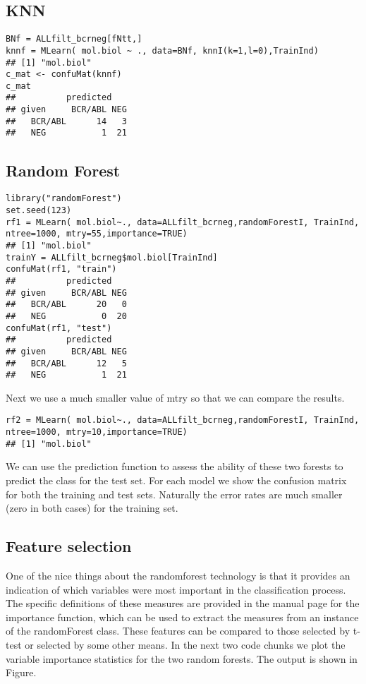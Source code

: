\hypertarget{knn}{%
\subsection{KNN}\label{knn}}

\begin{verbatim}
BNf = ALLfilt_bcrneg[fNtt,]
knnf = MLearn( mol.biol ~ ., data=BNf, knnI(k=1,l=0),TrainInd)
## [1] "mol.biol"
c_mat <- confuMat(knnf)
c_mat 
##          predicted
## given     BCR/ABL NEG
##   BCR/ABL      14   3
##   NEG           1  21
\end{verbatim}

\hypertarget{random-forest}{%
\subsection{Random Forest}\label{random-forest}}

\begin{verbatim}
library("randomForest")
set.seed(123)
rf1 = MLearn( mol.biol~., data=ALLfilt_bcrneg,randomForestI, TrainInd, ntree=1000, mtry=55,importance=TRUE)
## [1] "mol.biol"
trainY = ALLfilt_bcrneg$mol.biol[TrainInd]
confuMat(rf1, "train")
##          predicted
## given     BCR/ABL NEG
##   BCR/ABL      20   0
##   NEG           0  20
confuMat(rf1, "test")
##          predicted
## given     BCR/ABL NEG
##   BCR/ABL      12   5
##   NEG           1  21
\end{verbatim}

Next we use a much smaller value of mtry so that we can compare the
results.

\begin{verbatim}
rf2 = MLearn( mol.biol~., data=ALLfilt_bcrneg,randomForestI, TrainInd, ntree=1000, mtry=10,importance=TRUE)
## [1] "mol.biol"
\end{verbatim}

We can use the prediction function to assess the ability of these two
forests to predict the class for the test set. For each model we show
the confusion matrix for both the training and test sets. Naturally the
error rates are much smaller (zero in both cases) for the training set.

\hypertarget{feature-selection}{%
\subsection{Feature selection}\label{feature-selection}}

One of the nice things about the randomforest technology is that it
provides an indication of which variables were most important in the
classification process. The specific definitions of these measures are
provided in the manual page for the importance function, which can be
used to extract the measures from an instance of the randomForest class.
These features can be compared to those selected by t-test or selected
by some other means. In the next two code chunks we plot the variable
importance statistics for the two random forests. The output is shown in
Figure.

